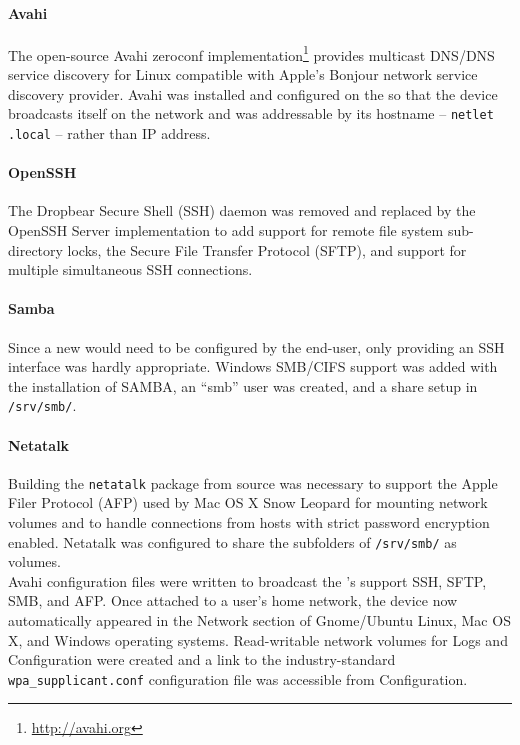 \paragraph{Avahi} The open-source Avahi zeroconf implementation\footnote{\url{http://avahi.org}} provides multicast DNS/DNS service discovery for Linux compatible with Apple's Bonjour network service discovery provider.  Avahi was installed and configured on the \olimex so that the device broadcasts itself on the network and was addressable by its hostname -- \texttt{netlet
.local} -- rather than IP address.

\paragraph{OpenSSH} The Dropbear Secure Shell (SSH) daemon was removed and replaced by the OpenSSH Server implementation to add support for remote file system sub-directory locks, the Secure File Transfer Protocol (SFTP), and support for multiple simultaneous SSH connections.

\paragraph{Samba} Since a new \netlet would need to be configured by the end-user, only providing an SSH interface was hardly appropriate.  Windows SMB/CIFS support was added with the installation of SAMBA, an ``smb'' user was created, and a share setup in \texttt{/srv/smb/}.

\paragraph{Netatalk} Building the \texttt{netatalk} package from source was necessary to support the Apple Filer Protocol (AFP) used by Mac OS X Snow Leopard for mounting network volumes and to handle connections from hosts with strict password encryption enabled.  Netatalk was configured to share the subfolders of \texttt{/srv/smb/} as volumes.
\newline
\\
Avahi configuration files were written to broadcast the \netlet 's support SSH, SFTP, SMB, and AFP.  Once attached to a user's home network, the device now automatically appeared in the Network section of Gnome/Ubuntu Linux, Mac OS X, and Windows operating systems.  Read-writable network volumes for Logs and Configuration were created and a link to the industry-standard \texttt{wpa\_supplicant.conf} \wifi configuration file was accessible from Configuration.\\

